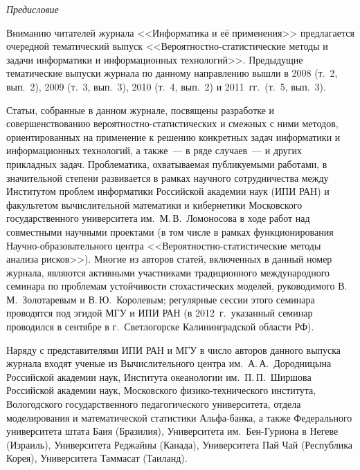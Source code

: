 
   { %
   { %
   
   \vspace*{-48pt}
   \begin{center}\LARGE
   \textit{Предисловие}
   \end{center}
   
   
   \vspace*{25mm}
   
   \thispagestyle{empty}
   
   { %
      Вниманию читателей журнала <<Информатика и её применения>> предлагается 
      очередной тематический выпуск <<Вероятностно-статистические методы и 
      задачи информатики и информационных технологий>>. Предыдущие тематические 
      выпуски журнала по данному направлению вышли в 2008 (т.~2, вып.~2), 
       2009 (т.~3, вып.~3),  2010 (т.~4, вып.~2)  и 2011~гг.\ (т.~5, вып.~3).
      
      Статьи, собранные в данном журнале, посвящены разработке и совершенствованию 
ве\-ро\-ят\-но\-ст\-но-ста\-ти\-сти\-че\-ских и смежных с ними методов, ориентированных 
на применение к решению конкретных задач информатики и информационных 
технологий, а также~--- в ряде случаев~--- и других прикладных задач. Проблематика, 
охватываемая публикуемыми работами, в значительной степени развивается в рамках 
научного сотрудничества между Институтом проблем информатики Российской академии 
наук (ИПИ РАН) и факультетом вычислительной математики и кибернетики Московского 
государственного университета им.\ М.\,В.~Ломоносова в ходе работ над совместными 
научными проектами (в том числе в рамках функционирования 
      На\-уч\-но-обра\-зо\-ва\-тель\-но\-го центра 
      <<Ве\-ро\-ят\-но\-ст\-но-ста\-ти\-сти\-че\-ские методы анализа рисков>>). Многие 
из авторов статей, включенных в данный номер журнала, являются активными 
участниками традиционного международного семинара по проблемам устойчивости 
стохастических моделей, руководимого В.\,М.~Золотаревым и В.\,Ю.~Королевым; 
регулярные сессии этого семинара проводятся под эгидой МГУ и ИПИ РАН (в 2012~г.\ 
указанный семинар проводился в сентябре в г.~Светлогорске Калининградской области 
РФ). 
      
      Наряду с представителями ИПИ РАН и МГУ в число авторов данного выпуска 
журнала входят ученые из Вычислительного центра им.\ А.\,А.~Дородницына Российской 
академии наук, Института океанологии им.\ П.\,П.~Ширшова Российской академии наук, 
Московского фи\-зи\-ко-тех\-ни\-че\-ско\-го института, Вологодского государственного 
педагогического университета, отдела моделирования и математической статистики 
Аль\-фа-бан\-ка, а также Федерального университета штата Баия (Бразилия), Университета 
им.\ Бен-Гу\-рио\-на в Негеве (Израиль), Университета Реджайны (Канада), Университета 
Пай Чай (Республика Корея), Университета Таммасат (Таиланд).
      
}}}
